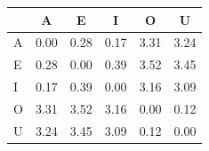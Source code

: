 \begin{tabular}{lccccc}
\toprule
\rowcolor{col01}
 & A & E & I & O & U \\
\midrule
A & 0.00 & 0.28 & 0.17 & 3.31 & 3.24 \\
E & 0.28 & 0.00 & 0.39 & 3.52 & 3.45 \\
I & 0.17 & 0.39 & 0.00 & 3.16 & 3.09 \\
O & 3.31 & 3.52 & 3.16 & 0.00 & 0.12 \\
U & 3.24 & 3.45 & 3.09 & 0.12 & 0.00 \\
\bottomrule
\end{tabular}
